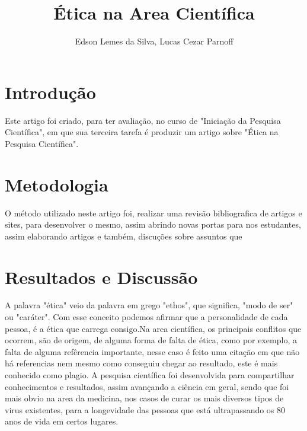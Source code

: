 \documentclass[12pt]{article}
\title{Ética na Area Cientí­fica}
\author{Edson Lemes da Silva, Lucas Cezar Parnoff}
\begin{document}
 

\maketitle

\begin{abstract}
  
\end{abstract}
     
\begin{resumo} 
  
\end{resumo}


\section{Introdução}\label{sec:introducao}
Este artigo foi criado, para ter avaliação,
no curso de "Iniciação da Pesquisa Científica",
em que sua terceira tarefa é produzir um artigo
sobre "Ética na Pesquisa Científica".
\section{Metodologia} \label{sec:desenvolv}
O método utilizado neste artigo foi, realizar uma 
revisão bibliografica de artigos e sites, 
para desenvolver o mesmo, assim abrindo novas portas
para nos estudantes, assim elaborando artigos e
também, discuções sobre assuntos que   
\section{Resultados e Discussão}\label{sec:resuldisc}
A palavra "ética" veio da palavra em grego "ethos", que
significa, "modo de ser" ou "caráter"\cite{signi:etmo}.
Com esse conceito podemos afirmar que a personalidade de
cada pessoa, é a ética que carrega consigo.Na area
científica, os principais conflitos que ocorrem, são
de origem, de alguma forma de falta de ética, como por 
exemplo, a falta de alguma refêrencia importante, nesse 
caso é feito uma citação em que não há referencias nem 
mesmo como conseguiu chegar ao resultado, este é mais 
conhecido como plagio.
A pesquisa científica foi desenvolvida para compartilhar 
conhecimentos e resultados, assim avançando a ciência em
geral, sendo que foi mais obvio na area da medicina,
nos casos de curar os mais diversos tipos de virus 
existentes, para a longevidade das pessoas que está
ultrapassando os 80 anos de vida em certos lugares.

 



\end{document}
